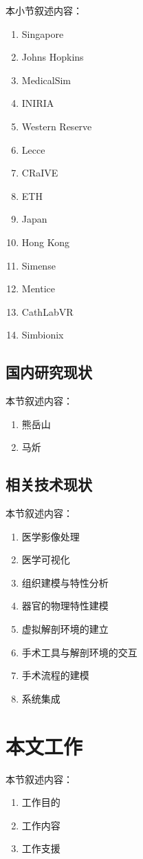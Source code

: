 本小节叙述内容：
\begin{enumerate}
  \item Singapore
  \item Johns Hopkins
  \item MedicalSim
  \item INIRIA
  \item Western Reserve
  \item Lecce
  \item CRaIVE
  \item ETH
  \item Japan
  \item Hong Kong
  \item Simense
  \item Mentice
  \item CathLabVR
  \item Simbionix
\end{enumerate}

\subsection{国内研究现状}

本节叙述内容：
\begin{enumerate}
  \item 熊岳山
  \item 马炘
\end{enumerate}

\subsection{相关技术现状}

本节叙述内容：
\begin{enumerate}
  \item 医学影像处理
  \item 医学可视化
  \item 组织建模与特性分析
  \item 器官的物理特性建模
  \item 虚拟解剖环境的建立
  \item 手术工具与解剖环境的交互
  \item 手术流程的建模
  \item 系统集成
\end{enumerate}

\section{本文工作}

本节叙述内容：
\begin{enumerate}
  \item 工作目的
  \item 工作内容
  \item 工作支援
\end{enumerate}
